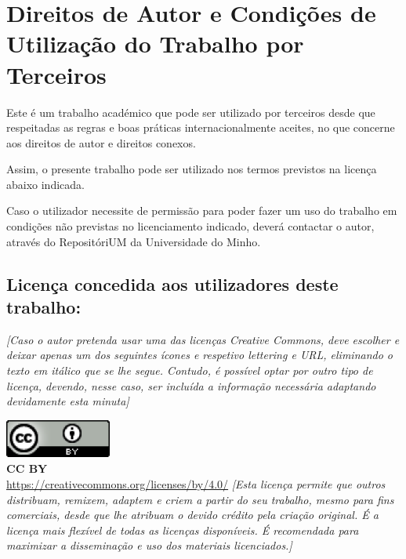 \chapter*{Direitos de Autor e Condições de Utilização do Trabalho por Terceiros}
\setlength{\parskip}{1em}
\noindent
Este é um trabalho académico que pode ser utilizado por terceiros desde que respeitadas as regras e boas práticas internacionalmente aceites, no que concerne aos direitos de autor e direitos conexos.

\noindent
Assim, o presente trabalho pode ser utilizado nos termos previstos na licença abaixo indicada.

\noindent
Caso o utilizador necessite de permissão para poder fazer um uso do trabalho em condições não previstas no licenciamento indicado, deverá contactar o autor, através do RepositóriUM da Universidade do Minho.

\section*{Licença concedida aos utilizadores deste trabalho:}

\textit{[Caso o autor pretenda usar uma das licenças Creative Commons, deve escolher e deixar apenas um dos seguintes ícones e respetivo lettering e URL, eliminando o texto em itálico que se lhe segue. Contudo, é possível optar por outro tipo de licença, devendo, nesse caso, ser incluída a informação necessária adaptando devidamente esta minuta]}

\noindent
\includegraphics[]{images/CCBY.png}
\\
\textbf{CC BY}
\\
\url{https://creativecommons.org/licenses/by/4.0/}
\textit{[Esta licença permite que outros distribuam, remixem, adaptem e criem a partir do seu trabalho, mesmo para fins comerciais, desde que lhe atribuam o devido crédito pela criação original. É a licença mais flexível de todas as licenças disponíveis. É recomendada para maximizar a disseminação e uso dos materiais licenciados.]}


